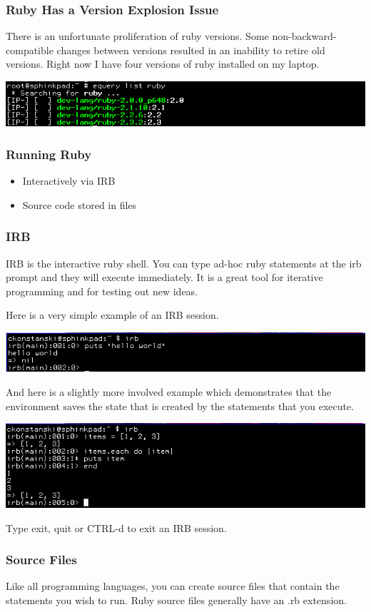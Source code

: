 \documentclass[helvetica,english,utf8,notitle,nologo]{beamer}
\begin{document}
\begin{frame}
  \frametitle{Ruby Has a Version Explosion Issue}

  There is an unfortunate proliferation of ruby versions. Some
  non-backward-compatible changes between versions resulted in an
  inability to retire old versions. Right now I have four versions of
  ruby installed on my laptop.

  \includegraphics[scale=0.5]{eselect_1}
  
\end{frame}

\begin{frame}
  \frametitle{Running Ruby}
  \begin{itemize}
  \item Interactively via IRB
  \item Source code stored in files
  \end{itemize}
\end{frame}

\begin{frame}
  \frametitle{IRB}

  IRB is the interactive ruby shell. You can type ad-hoc ruby
  statements at the irb prompt and they will execute immediately. It
  is a great tool for iterative programming and for testing out new
  ideas.

  Here is a very simple example of an IRB session.

  \includegraphics[scale=0.5]{irb_1}

  And here is a slightly more involved example which demonstrates that
  the environment saves the state that is created by the statements
  that you execute.

  \includegraphics[scale=0.5]{irb_2}

  Type exit, quit or CTRL-d to exit an IRB session.
\end{frame}

\begin{frame}
  \frametitle{Source Files}

  Like all programming languages, you can create source files that
  contain the statements you wish to run. Ruby source files generally
  have an .rb extension.
  
  
  
\end{frame}
\end{document}
